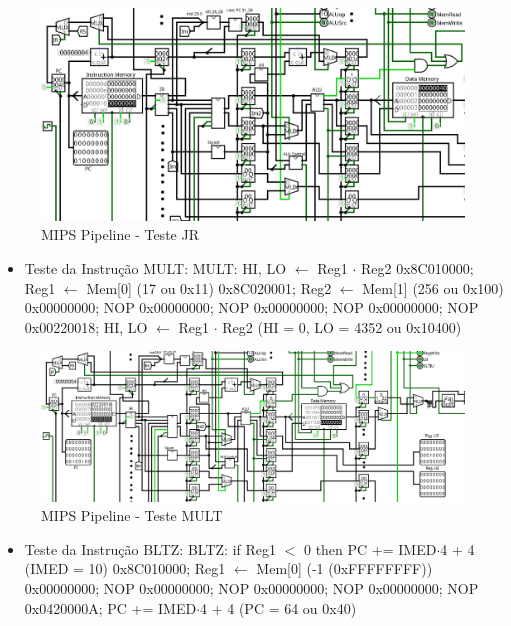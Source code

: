 \documentclass{report}
\begin{document}
        \begin{figure}[h!]
            \centering
            \includegraphics[width=\linewidth]{images/prints/Pipeline/Teste JR.png}
            \caption{\label{print:pipeline_test_JR} MIPS Pipeline - Teste JR}
        \end{figure}

        \begin{itemize}
            \item Teste da Instrução MULT:
                \subitem MULT: HI, LO $\leftarrow$ Reg1 $\cdot$ Reg2
                \subitem 0x8C010000; Reg1 $\leftarrow$ Mem[0] (17 ou 0x11)
                \subitem 0x8C020001; Reg2 $\leftarrow$ Mem[1] (256 ou 0x100)
                \subitem 0x00000000; NOP
                \subitem 0x00000000; NOP
                \subitem 0x00000000; NOP
                \subitem 0x00000000; NOP
                \subitem 0x00220018; HI, LO $\leftarrow$ Reg1 $\cdot$ Reg2 (HI = 0, LO = 4352 ou 0x10400)
        \end{itemize}
        
        \begin{figure}[h!]
            \centering
            \includegraphics[width=\linewidth]{images/prints/Pipeline/Teste MULT.png}
            \caption{\label{print:pipeline_test_MULT} MIPS Pipeline - Teste MULT}
        \end{figure}

        \begin{itemize}
            \item Teste da Instrução BLTZ:
                \subitem BLTZ: if Reg1 $<$ 0 then PC += IMED$\cdot$4 + 4 (IMED = 10)
                \subitem 0x8C010000; Reg1 $\leftarrow$ Mem[0] (-1 (0xFFFFFFFF))
                \subitem 0x00000000; NOP
                \subitem 0x00000000; NOP
                \subitem 0x00000000; NOP
                \subitem 0x00000000; NOP
                \subitem 0x0420000A; PC += IMED$\cdot$4 + 4 (PC = 64 ou 0x40)
        \end{itemize}
        
\end{document}
